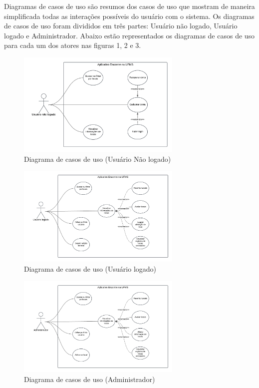     Diagramas de casos de uso são resumos dos casos de uso que mostram de maneira simplificada todas as interações possíveis do usuário com o sistema. Os diagramas de casos de uso foram divididos em três partes: Usuário não logado, Usuário logado e Administrador. Abaixo estão representados os diagramas de casos de uso para cada um dos atores nas figuras 1, 2 e 3.


    \begin{figure}[h]
        \centering
        \includegraphics[width=0.7\textwidth]{imagens/usuarioNaoLogado.png}
        \caption{\scriptsize Diagrama de casos de uso (Usuário Não logado)}
        \label{fig:casosDeUsoUsuarioNaoLogado}
    \end{figure}

    \begin{figure}[h]
        \centering
        \includegraphics[width=0.7\textwidth]{imagens/usuarioLogado.png}
        \caption{\scriptsize Diagrama de casos de uso (Usuário logado)}
        \label{fig:casosDeUsoUsuarioLogado}
    \end{figure}

    \begin{figure}[h]
        \centering
        \includegraphics[width=0.7\textwidth]{imagens/administrador.png}
        \caption{\scriptsize Diagrama de casos de uso (Administrador)}
        \label{fig:casosDeUsoAdministrador}
    \end{figure}
    \FloatBarrier


